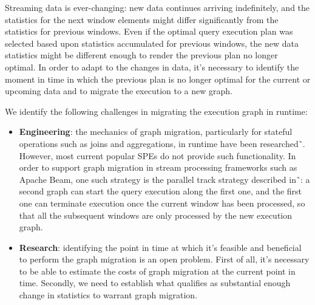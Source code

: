 Streaming data is ever-changing: new data continues arriving indefinitely, and the statistics for the next window elements might differ significantly from the statistics for previous windows. 
Even if the optimal query execution plan was selected based upon statistics accumulated for previous windows, the new data statistics might be different enough to render the previous plan no longer optimal. In order to adapt to the changes in data, it's necessary to identify the moment in time in which the previous plan is no longer optimal for the current or upcoming data and to migrate the execution to a new graph. 

We identify the following challenges in migrating the execution graph in runtime:
\begin{itemize}
    \item \textbf{Engineering}: 
    the mechanics of graph migration, particularly for stateful operations such as joins and aggregations, in runtime have been researched˜\cite{zhu2004dynamic}.
 However, most current popular SPEs do not provide such functionality. In order to support graph migration in stream processing frameworks such as Apache Beam, one such strategy is the parallel track strategy described in˜\cite{zhu2004dynamic}: a second graph can start the query execution along the first one, and the first one can terminate execution once the current window has been processed, so that all the subsequent windows are only processed by the new execution graph.
    \item \textbf{Research}: identifying the point in time at which it's feasible and beneficial to perform the graph migration is an open problem. First of all, it's necessary to be able to estimate the costs of graph migration at the current point in time. Secondly, we need to establish what qualifies as substantial enough change in statistics to warrant graph migration. %
\end{itemize}